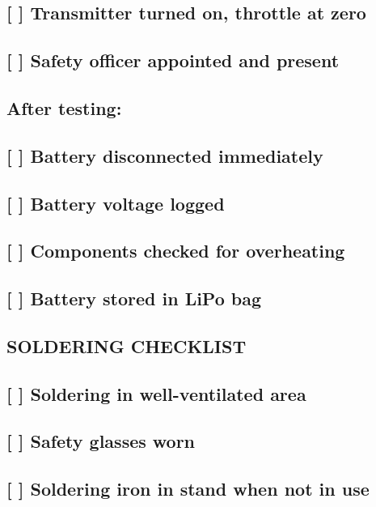 \documentclass[11pt,letterpaper]{article}
\begin{document}
{{\subsection*{[ ] Transmitter turned on, throttle at zero}

\subsection*{[ ] Safety officer appointed and present}

\subsection*{After testing:}

\subsection*{[ ] Battery disconnected immediately}

\subsection*{[ ] Battery voltage logged}

\subsection*{[ ] Components checked for overheating}

\subsection*{[ ] Battery stored in LiPo bag}

\subsection*{SOLDERING CHECKLIST}

\subsection*{[ ] Soldering in well-ventilated area}

\subsection*{[ ] Safety glasses worn}

\subsection*{[ ] Soldering iron in stand when not in use}

}}
\end{document}
